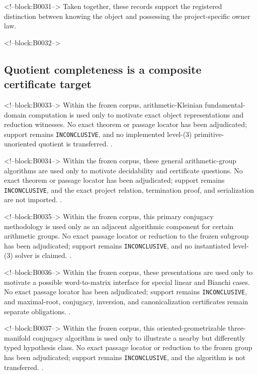 \documentclass[11pt,a4paper]{article}
\begin{document}
<!--block:B0031-->
Taken together, these records support the registered distinction between knowing the object and possessing the project-specific owner law.

<!--block:B0032-->
\subsection{Quotient completeness is a composite certificate target}

<!--block:B0033-->
Within the frozen corpus, arithmetic-Kleinian fundamental-domain computation is used only to motivate exact object representations and reduction witnesses. No exact theorem or passage locator has been adjudicated; support remains \texttt{INCONCLUSIVE}, and no implemented level-(3) primitive-unoriented quotient is transferred.
\citep{P29-S10}.

<!--block:B0034-->
Within the frozen corpus, these general arithmetic-group algorithms are used only to motivate decidability and certificate questions. No exact theorem or passage locator has been adjudicated; support remains \texttt{INCONCLUSIVE}, and the exact project relation, termination proof, and serialization are not imported.
\citep{P29-S11}.

<!--block:B0035-->
Within the frozen corpus, this primary conjugacy methodology is used only as an adjacent algorithmic component for certain arithmetic groups. No exact passage locator or reduction to the frozen subgroup has been adjudicated; support remains \texttt{INCONCLUSIVE}, and no instantiated level-(3) solver is claimed.
\citep{P29-S15}.

<!--block:B0036-->
Within the frozen corpus, these presentations are used only to motivate a possible word-to-matrix interface for special linear and Bianchi cases. No exact passage locator has been adjudicated; support remains \texttt{INCONCLUSIVE}, and maximal-root, conjugacy, inversion, and canonicalization certificates remain separate obligations.
\citep{P29-S16}.

<!--block:B0037-->
Within the frozen corpus, this oriented-geometrizable three-manifold conjugacy algorithm is used only to illustrate a nearby but differently typed hypothesis class. No exact passage locator or reduction to the frozen group has been adjudicated; support remains \texttt{INCONCLUSIVE}, and the algorithm is not transferred.
\citep{P29-S12}.
\end{document}
